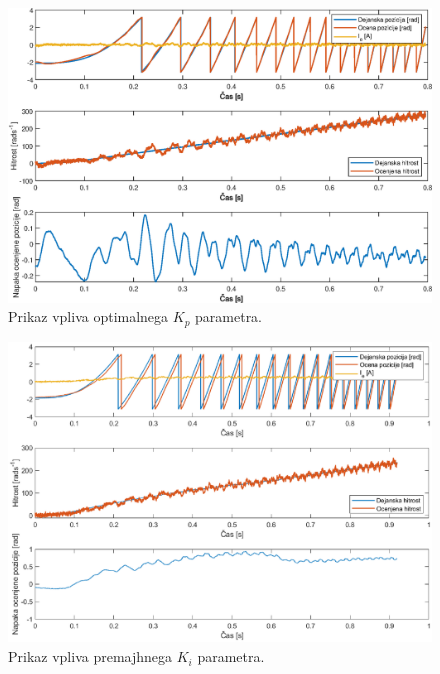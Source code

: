 \documentclass[a4paper,twoside,openright,12pt,slovene]{book}
\begin{document}
\begin{figure}[!htbp]
    \centering
    \includegraphics[width=1\columnwidth]{Slike/PItuning_Kp_stable.eps}
    \caption{\label{PItuning_Kp_stable} Prikaz vpliva optimalnega $K_p$ parametra. }
\end{figure}

\begin{figure}[!htbp]
    \centering
    \includegraphics[width=1\columnwidth]{Slike/PItuning_Ki_unstableLow.eps}
    \caption{\label{PItuning_Ki_unstableLow} Prikaz vpliva premajhnega $K_i$ parametra. }
\end{figure}
\end{document}
